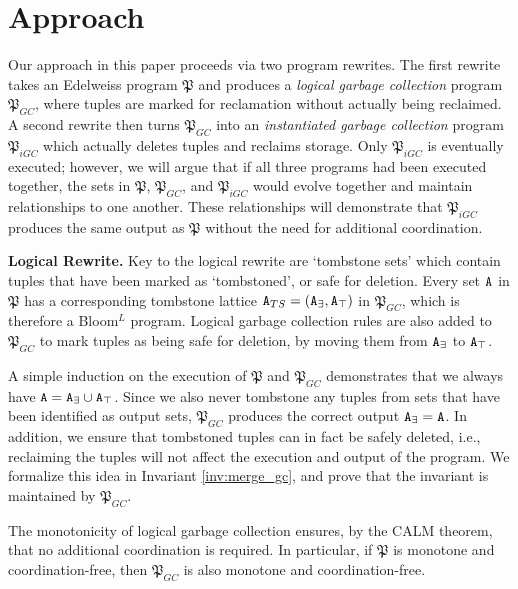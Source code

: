 
\section{Approach}
\label{sec:approach}

Our approach in this paper proceeds via two program rewrites.
The first rewrite takes an Edelweiss program $\mathfrak{P}$ and produces a \emph{logical garbage collection} program $\mathfrak{P}_{GC}$, where tuples are marked for reclamation without actually being reclaimed.
A second rewrite then turns $\mathfrak{P}_{GC}$ into an \emph{instantiated garbage collection} program $\mathfrak{P}_{iGC}$ which actually deletes tuples and reclaims storage.
Only $\mathfrak{P}_{iGC}$ is eventually executed;
however, we will argue that if all three programs had been executed together, the sets in $\mathfrak{P}$, $\mathfrak{P}_{GC}$, and $\mathfrak{P}_{iGC}$ would evolve together and maintain relationships to one another.
These relationships will demonstrate that $\mathfrak{P}_{iGC}$ produces the same output as $\mathfrak{P}$ without the need for additional coordination.

\textbf{Logical Rewrite.}
Key to the logical rewrite are `tombstone sets' which contain tuples that have been marked as `tombstoned', or safe for deletion.
Every set $\tt{A}$ in $\mathfrak{P}$ has a corresponding tombstone lattice $\tt{A}_{TS} = (\tt{A}_\exists, \tt{A}_\top)$ in $\mathfrak{P}_{GC}$, which is therefore a Bloom$^L$ program.
Logical garbage collection rules are also added to $\mathfrak{P}_{GC}$ to mark tuples as being safe for deletion, by moving them from $\tt{A}_\exists$ to $\tt{A}_\top$.

A simple induction on the execution of $\mathfrak{P}$ and $\mathfrak{P}_{GC}$ demonstrates that we always have $\tt{A} = \tt{A}_\exists \cup \tt{A}_\top$.
Since we also never tombstone any tuples from sets that have been identified as output sets, $\mathfrak{P}_{GC}$ produces the correct output $\tt{A}_\exists = \tt{A}$.
In addition, we ensure that tombstoned tuples can in fact be safely deleted, i.e., reclaiming the tuples will not affect the execution and output of the program.
We formalize this idea in Invariant \ref{inv:merge_gc}, and prove that the invariant is maintained by $\mathfrak{P}_{GC}$.

The monotonicity of logical garbage collection ensures, by the CALM theorem, that no additional coordination is required.
In particular, if $\mathfrak{P}$ is monotone and coordination-free, then $\mathfrak{P}_{GC}$ is also monotone and coordination-free.


